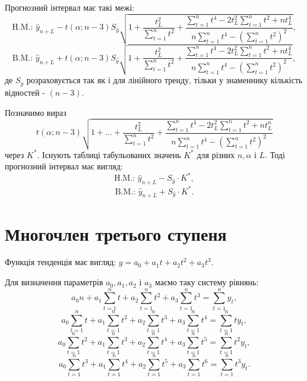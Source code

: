 \documentclass[a4paper, fontsize=10pt, oneside]{article}
\begin{document}
	Прогнозний інтервал має такі межі:
	\begin{equation*}
		\text{H.M.: } \hat y_{n+L} - t(\alpha; n-3) S_{\hat y} \sqrt{1 + \frac{t_L^2}{\sum_{t=1}^n t^2} + \frac{\sum_{t=1}^n t^4 - 2 t^2_L \sum_{t=1}^n t^2 + n t_L^4}{n \sum_{t=1}^n t^4 - (\sum_{t=1}^n t^2)^2}},
	\end{equation*}
	\begin{equation*}
		\text{B.M.: } \hat y_{n+L} + t(\alpha; n-3) S_{\hat y} \sqrt{1 + \frac{t_L^2}{\sum_{t=1}^n t^2} + \frac{\sum_{t=1}^n t^4 - 2 t^2_L \sum_{t=1}^n t^2 + n t_L^4}{n \sum_{t=1}^n t^4 - (\sum_{t=1}^n t^2)^2}},
	\end{equation*}
	де $S_{\hat y}$ розраховується так як і для лінійного тренду, тільки у знаменнику кількість відностей - $(n-3).$
	
	Позначимо вираз
	\begin{equation*}
		t(\alpha; n-3) \sqrt{1 + \dots + \frac{t_L^2}{\sum_{t=1}^n t^2} + \frac{\sum_{t=1}^n t^4 - 2 t^2_L \sum_{t=1}^n t^2 + n t_L^n}{n \sum_{t=1}^n t^4 - (\sum_{t=1}^n t^2)^2}}
	\end{equation*}
	через $K^*.$ Існують таблиці табульованих значень $K^*$ для різних $n, \alpha$ і $L.$ Тоді прогнозний інтервал має вигляд:
	\begin{equation*}
		\text{H.M.: } \hat y_{n+L} - S_{\hat y} \cdot K^*,
	\end{equation*}
	\begin{equation*}
		\text{B.M.: } \hat y_{n+L} + S_{\hat y} \cdot K^*.
	\end{equation*}
	
	\section{Многочлен третього ступеня}
	
	Функція тенденція має вигляд: $y = a_0 + a_1 t + a_2 t^2 + a_3 t^3.$
	
	Для визначення параметрів $a_0, a_1, a_2$ і $a_3$ маємо таку систему рівнянь:
	\begin{equation*}
		a_0 n + a_1 \sum_{t=1}^n t + a_2 \sum_{t=1}^n t^2 + a_3 \sum_{t=1}^n t^3 = \sum_{t=1}^n y_t,
	\end{equation*}
	\begin{equation*}
		a_0 \sum_{t=1}^n t + a_1 \sum_{t=1}^n t^2 + a_2 \sum_{t=1}^n t^3 + a_3 \sum_{t=1}^n t^4 = \sum_{t=1}^n t y_t,
	\end{equation*}
	\begin{equation*}
		a_0 \sum_{t=1}^n t^2 + a_1 \sum_{t=1}^n t^3 + a_2 \sum_{t=1}^n t^4 + a_3 \sum_{t=1}^n t^5 = \sum_{t=1}^n t^2 y_t,
	\end{equation*}
	\begin{equation*}
		a_0 \sum_{t=1}^n t^3 + a_1 \sum_{t=1}^n t^4 + a_2 \sum_{t=1}^n t^5 + a_3 \sum_{t=1}^n t^6 = \sum_{t=1}^n t^3 y_t.
	\end{equation*}
	
\end{document}
